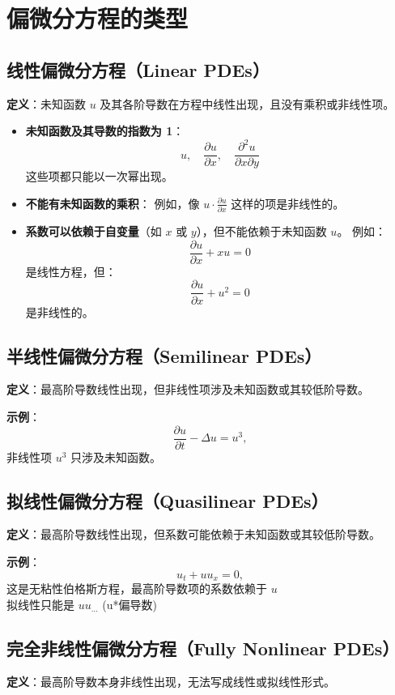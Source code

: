 \section{偏微分方程的类型}

\subsection{线性偏微分方程（Linear PDEs）}
\textbf{定义}：未知函数 \(u\) 及其各阶导数在方程中线性出现，且没有乘积或非线性项。  

\begin{itemize}
    \item \textbf{未知函数及其导数的指数为 1}：
    \[
    u, \quad \frac{\partial u}{\partial x}, \quad \frac{\partial^2 u}{\partial x \partial y}
    \]
    这些项都只能以一次幂出现。

    \item \textbf{不能有未知函数的乘积}：  
    例如，像 \(u \cdot \frac{\partial u}{\partial x}\) 这样的项是非线性的。

    \item \textbf{系数可以依赖于自变量}（如 \(x\) 或 \(y\)），但不能依赖于未知函数 \(u\)。  
    例如：
    \[
    \frac{\partial u}{\partial x} + x u = 0
    \]
    是线性方程，但：
    \[
    \frac{\partial u}{\partial x} + u^2 = 0
    \]
    是非线性的。
\end{itemize}

\subsection{半线性偏微分方程（Semilinear PDEs）}
\textbf{定义}：最高阶导数线性出现，但非线性项涉及未知函数或其较低阶导数。

\textbf{示例}：
\begin{equation}
\frac{\partial u}{\partial t} - \Delta u = u^3,
\end{equation}
非线性项 \(u^3\) 只涉及未知函数。

\subsection{拟线性偏微分方程（Quasilinear PDEs）}
\textbf{定义}：最高阶导数线性出现，但系数可能依赖于未知函数或其较低阶导数。

\textbf{示例}：
\begin{equation}
u_t + u u_x = 0,
\end{equation}
这是无粘性伯格斯方程，最高阶导数项的系数依赖于 \(u\) \\
拟线性只能是 \(u u_{...}\) (u*偏导数)

\subsection{完全非线性偏微分方程（Fully Nonlinear PDEs）}
\textbf{定义}：最高阶导数本身非线性出现，无法写成线性或拟线性形式。
